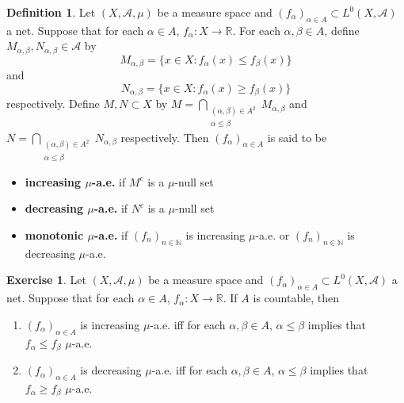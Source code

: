 \documentclass[12pt]{amsart}
\theoremstyle{definition}
\newtheorem{defn}[definition]{Definition}
\newtheorem{ex}[definition]{Exercise}
\newcommand{\al}{\alpha}
\newcommand{\be}{\beta}
\newcommand{\N}{\mathbb{N}}
\newcommand{\R}{\mathbb{R}}
\newcommand{\MA}{\mathcal{A}}
\begin{document}
	\begin{defn}
		Let $(X, \MA, \mu)$ be a measure space and $(f_\al)_{\al \in A} \subset L^0(X, \MA)$ a net. Suppose that for each $\al \in A$, $f_{\al}:X \rightarrow \R$. For each $\al, \be \in A$, define $M_{\al, \be}, N_{\al, \be} \in \MA$ by
		$$M_{\al, \be} = \{x \in X: f_{\al}(x) \leq f_{\be}(x) \}$$ 
		and 
		$$N_{\al, \be} = \{x \in X: f_{\al}(x) \geq f_{\be}(x) \}$$
		respectively. Define $M,N \subset X$ by $M = \bigcap\limits_{\substack{(\al, \be) \in A^2 \\ \al \leq \be}} M_{\al, \be}$ and $N = \bigcap\limits_{\substack{(\al, \be) \in A^2 \\ \al \leq \be}} N_{\al, \be}$ respectively. Then $(f_{\al})_{\al \in A}$ is said to be 
		\begin{itemize}
			\item \textbf{increasing $\mu$-a.e.} if $M^c$ is a $\mu$-null set
			\item \textbf{decreasing $\mu$-a.e.} if $N^c$ is a $\mu$-null set
			\item \textbf{monotonic $\mu$-a.e.} if $(f_n)_{n \in \N}$ is increasing $\mu$-a.e. or $(f_n)_{n \in \N}$ is decreasing $\mu$-a.e.
		\end{itemize} 
	\end{defn}

	\begin{ex}
		Let $(X, \MA, \mu)$ be a measure space and $(f_\al)_{\al \in A} \subset L^0(X, \MA)$ a net. Suppose that for each $\al \in A$, $f_{\al}:X \rightarrow \R$. If $A$ is countable, then 
		\begin{enumerate}
			\item $(f_\al)_{\al \in A}$ is increasing $\mu$-a.e. iff for each $\al, \be \in A$, $\al \leq \be$ implies that $f_{\al} \leq f_{\be}$ $\mu$-a.e.
			\item $(f_\al)_{\al \in A}$ is decreasing $\mu$-a.e. iff for each $\al, \be \in A$, $\al \leq \be$ implies that $f_{\al} \geq f_{\be}$ $\mu$-a.e.
		\end{enumerate}
	\end{ex}
\end{document}
